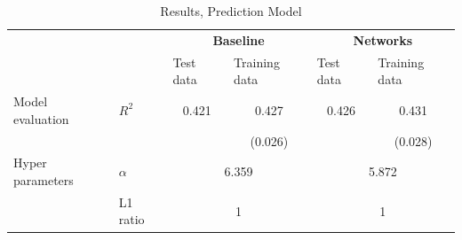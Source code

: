 \FloatBarrier
\begin{table}[htbp]
  \centering
  \caption{Results, Prediction Model}
  \label{tab: model1}
    \begin{tabular}{rlcccc}
    \hline
          &       & \multicolumn{2}{c}{\textbf{Baseline}} & \multicolumn{2}{c}{\textbf{Networks}} \\ 
          &       & \multicolumn{1}{l}{Test data} & \multicolumn{1}{l}{Training data} & \multicolumn{1}{l}{Test data} & \multicolumn{1}{l}{Training data} \\ \hline
    \multicolumn{1}{l}{Model evaluation} & $R^2$  & \multicolumn{1}{c}{0.421} & \multicolumn{1}{c}{0.427} & \multicolumn{1}{c}{0.426} & \multicolumn{1}{c}{0.431} \\
          &       &  &  \multicolumn{1}{c}{(0.026)}     &       & \multicolumn{1}{c}{(0.028)} \\
    \multicolumn{1}{l}{Hyper parameters} & $\alpha$ & \multicolumn{2}{c}{6.359} & \multicolumn{2}{c}{5.872} \\
          & L1 ratio & \multicolumn{2}{c}{1} & \multicolumn{2}{c}{1} \\ \hline
    \end{tabular}%
  \label{tab:addlabel}%
\end{table}%
\FloatBarrier

